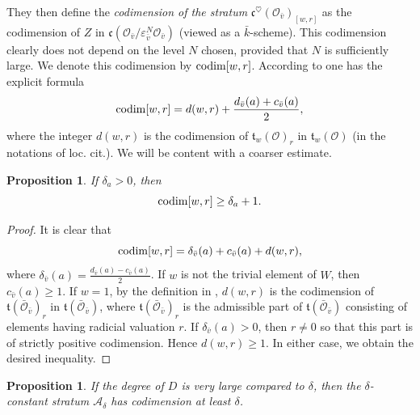 \documentclass[12pt,english]{smfart}
\numberwithin{equation}{subsection}
\newtheorem{proposition}[equation]{Proposition}
\theoremstyle{remark}
\begin{document}
They then define the \emph{codimension of the stratum} $\mathfrak{c}^\heartsuit(\mathcal{O}_{\bar{v}})_{[w,r]}$ as the codimension of $Z$ in $\mathfrak{c}(\mathcal{O}_{\bar{v}}/\varepsilon_{\bar{v}}^N\mathcal{O}_{\bar{v}})$ (viewed as a $\bar{k}$-scheme). This codimension clearly does not depend on the level $N$ chosen, provided that $N$ is sufficiently large. We denote this codimension by ${\rm codim}[w,r]$. According to \cite[8.2.2]{GKM-codim} one has the explicit formula
$${\rm codim}[w,r]=d(w,r)+\frac{d_{\bar{v}}(a)+c_{\bar{v}}(a)}{2},$$
where the integer $d(w,r)$ is the codimension of $\mathfrak{t}_w(\mathcal{O})_r$ in $\mathfrak{t}_w(\mathcal{O})$ (in the notations of loc. cit.). We will be content with a coarser estimate.

\begin{proposition}
If $\delta_a>0$, then
$$
{\rm codim}[w,r] \geq \delta_a+1.
$$
\end{proposition}

\begin{proof}
It is clear that
$$
{\rm codim}[w,r]= \delta_{\bar{v}}(a)+ c_{\bar{v}}(a)+ d(w,r),
$$
where $\delta_{\bar{v}}(a)=\frac{d_{\bar{v}}(a)-c_{\bar{v}}(a)}{2}$. If $w$ is not the trivial element of $W$, then $c_{\bar{v}}(a)\geq 1$. If $w=1$, by the definition in \cite[8.2.2]{GKM-codim}, $d(w,r)$ is the codimension of $\mathfrak{t}(\bar{\mathcal{O}}_{\bar{v}})_r$ in $\mathfrak{t}(\bar{\mathcal{O}}_{\bar{v}})$, where $\mathfrak{t}(\bar{\mathcal{O}}_{\bar{v}})_r$ is the admissible part of $\mathfrak{t}(\bar{\mathcal{O}}_{\bar{v}})$ consisting of elements having radicial valuation $r$. If $\delta_{\bar{v}}(a) > 0$, then $r\neq 0$ so that this part is of strictly positive codimension. Hence $d(w,r)\geq 1$. In either case, we obtain the desired inequality.
\end{proof}

\begin{proposition}\label{codimension}
If the degree of $D$ is very large compared to $\delta$, then the $\delta$-constant stratum $\mathcal{A}_\delta$ has codimension at least $\delta$.
\end{proposition}
\end{document}
